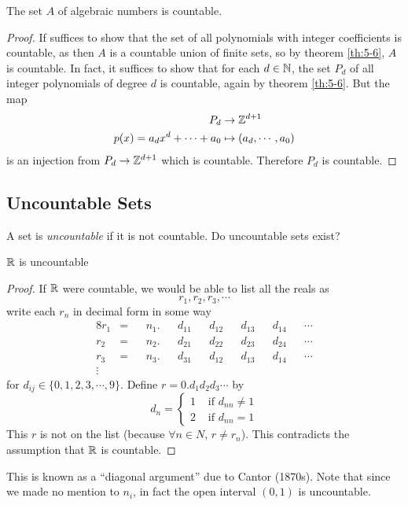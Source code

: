 \documentclass{article}
\begin{document}
\begin{nthm}\label{th:5-7}
    The set $A$ of algebraic numbers is countable.
\end{nthm}
\begin{proof}
    If suffices to show that the set of all polynomials with integer coefficients is countable,
    as then $A$ is a countable union of finite sets, so by theorem \ref{th:5-6}, $A$ is countable.
    In fact, it suffices to show that for each $d \in \mathbb{N}$, the set $P_d$ of all integer polynomials of degree $d$ is countable, again by theorem \ref{th:5-6}.
    But the map
    \begin{align*}
        P_d &\rightarrow \mathbb{Z}^{d + 1} \\
        p(x) = a_dx^d + \cdots + a_0 &\mapsto (a_d, \cdots, a_0)
    \end{align*}
    is an injection from $P_d \rightarrow \mathbb{Z}^{d + 1}$ which is countable. 
    Therefore $P_d$ is countable.
\end{proof}
\subsection{Uncountable Sets}
\begin{question}
    A set is \emph{uncountable} if it is not countable.
    Do uncountable sets exist?
\end{question}
\begin{nthm}\label{th:5-8}
    $\mathbb{R}$ is uncountable
\end{nthm}
\begin{proof}
    If $\mathbb{R}$ were countable, we would be able to list all the reals as
    \[
        r_1, r_2, r_3, \cdots  
    \]
    write each $r_n$ in decimal form in some way
    \begin{alignat*}{8}
        r_1 & = && n_1. && d_{11} && d_{12} && d_{13} && d_{14} && \cdots \\
        r_2 & = && n_2. && d_{21} && d_{22} && d_{23} && d_{24} && \cdots \\
        r_3 & = && n_3. && d_{31} && d_{12} && d_{13} && d_{14} && \cdots \\
        \vdots 
    \end{alignat*}
    for $d_{ij} \in \{0, 1, 2, 3, \cdots, 9\}$.
    Define $r = 0.d_1d_2d_3\cdots$ by
    \[
        d_n = \begin{cases}
            1 & \text{ if } d_{nn} \neq 1 \\
            2 & \text{ if } d_{nn} = 1
        \end{cases}
    \]
    This $r$ is not on the list (because $\forall n \in N$, $r \neq r_n$). 
    This contradicts the assumption that $\mathbb{R}$ is countable.
\end{proof}
\begin{remark}
    This is known as a ``diagonal argument'' due to Cantor (1870s).
    Note that since we made no mention to $n_i$, in fact the open interval $(0, 1)$ is uncountable. 
\end{remark}
\end{document}

